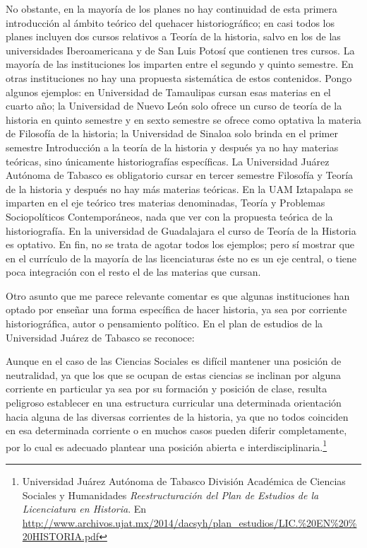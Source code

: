 No obstante, en la mayoría de los planes no hay continuidad de esta 
primera introducción al ámbito teórico del quehacer historiográfico; en 
casi todos los planes incluyen dos cursos relativos a Teoría de la 
historia, salvo en los de las universidades Iberoamericana y de San 
Luis Potosí que contienen tres cursos. La mayoría de las instituciones 
los imparten entre el segundo y quinto semestre. En otras instituciones 
no hay una propuesta sistemática de estos contenidos. Pongo algunos 
ejemplos: en Universidad de Tamaulipas cursan esas materias en 
el cuarto año; la Universidad de Nuevo León solo ofrece un curso de 
teoría de la historia en quinto semestre y en sexto semestre se ofrece 
como optativa la materia de Filosofía de la historia; la Universidad de 
Sinaloa solo brinda en el primer semestre Introducción a la teoría de 
la historia y después ya no hay materias teóricas, sino únicamente 
historiografías  específicas. La Universidad Juárez Autónoma de Tabasco 
es obligatorio cursar en tercer semestre Filosofía y Teoría de la 
historia y después no hay más materias teóricas. En la UAM Iztapalapa 
se imparten en el eje teórico tres materias denominadas, Teoría y 
Problemas Sociopolíticos Contemporáneos, nada que ver con la propuesta 
teórica de la historiografía. En la universidad de Guadalajara el curso 
de Teoría de la Historia es optativo. En fin, no se trata de agotar 
todos los ejemplos; pero sí mostrar que en el currículo de la mayoría 
de las licenciaturas éste no es un eje central, o tiene poca 
integración con el resto el de las materias que cursan. 

Otro asunto que me parece relevante comentar es que algunas 
instituciones han optado por enseñar una forma específica de hacer 
historia, ya sea por corriente historiográfica, autor o pensamiento 
político. En el plan de estudios de la Universidad Juárez de Tabasco se 
reconoce:

Aunque en el caso de las Ciencias Sociales es difícil mantener una 
posición de neutralidad, ya que los que se ocupan de estas ciencias se 
inclinan por alguna corriente en particular ya sea por su formación y 
posición de clase, resulta peligroso establecer en una estructura 
curricular una determinada orientación hacia alguna de las diversas 
corrientes de la historia, ya que no todos coinciden en esa determinada 
corriente o en muchos casos pueden diferir completamente, por lo cual 
es adecuado plantear una posición abierta e 
interdisciplinaria.\footnote{Universidad Juárez Autónoma de Tabasco 
División Académica de Ciencias Sociales y Humanidades 
\textit{Reestructuración del Plan de Estudios de la Licenciatura en 
Historia}. En 
\url{http://www.archivos.ujat.mx/2014/dacsyh/plan_estudios/LIC.\%20EN\%20\%20HISTORIA.pdf} 
}
\newpage

